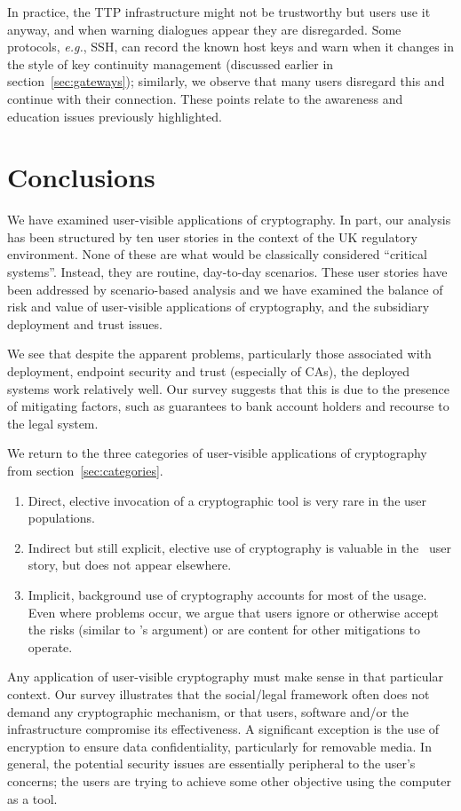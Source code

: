 \documentclass{article}
\def\citeN{\citet}
\newcommand{\eg}{\textit{e.g.}}
\begin{document}
In practice, the TTP infrastructure might not be trustworthy but users
use it  anyway, and when warning dialogues appear they are
disregarded.  Some protocols, \eg, SSH, can record the known host keys
and warn when it changes in the style of key continuity management (discussed earlier in section~\ref{sec:gateways}); similarly, we observe that many users
disregard this and continue with their connection.  These points relate to
the awareness and education issues previously highlighted.

\section{Conclusions}\label{sec:conclusions}

We have examined user-visible applications of cryptography.  In part, our analysis has been structured by ten user stories in the context of the UK
regulatory environment.  None of these are what would be classically
considered ``critical systems''.  Instead, they are routine,
day-to-day scenarios.  These user stories have been addressed by scenario-based analysis and we have
examined the balance of risk and value of user-visible applications of cryptography,
and the subsidiary deployment and trust issues.

We see that despite the apparent problems, particularly those associated with deployment, endpoint security and trust (especially of CAs), the deployed systems work relatively well.  
Our survey suggests that this is due to the presence of mitigating factors, such as guarantees to bank account holders and recourse to the legal system.

We return to the three categories of user-visible applications of cryptography from section~\ref{sec:categories}.
\begin{enumerate}
\item Direct, elective invocation of a cryptographic tool is very rare in the user populations.
\item  Indirect but still explicit, elective use of cryptography is valuable in the \USTdata\ user story, but does not appear elsewhere.
\item Implicit, background use of cryptography accounts for most of the usage.  Even where problems occur, we argue that users ignore or otherwise accept the risks (similar to \citeN{Herley09}'s argument) or are content for other mitigations to operate.
\end{enumerate}

Any application of user-visible cryptography must make sense in that particular context. 
Our survey illustrates that the  social/legal
framework often does not demand any cryptographic mechanism, or that users, software and/or the
infrastructure compromise its effectiveness.  A significant exception
is the use of encryption to ensure data confidentiality, particularly
for removable media.  
In general, the potential security issues are essentially
peripheral to the user's concerns; the users are trying to achieve some
other objective using the computer as a tool.
\end{document}

